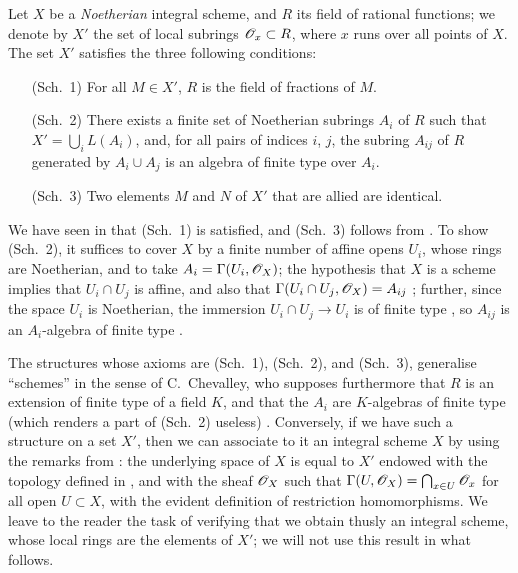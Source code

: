 \begin{env}[8.3.1]
\label{1.8.3.1}
Let $X$ be a {\em Noetherian} integral scheme, and $R$ its
field of rational functions; we denote by $X'$ the set of local subrings
$\mathscr{O}_x\subset R$, where $x$ runs over all points of $X$. The set $X'$ satisfies
the three following conditions:
\begin{enumerate}
  \item[(Sch.~1)] For all $M\in X'$, $R$ is the field of fractions of $M$.
  \item[(Sch.~2)] There exists a finite set of Noetherian subrings $A_i$ of $R$
    such that $X'=\bigcup_i L(A_i)$, and, for all pairs of indices $i$, $j$, the subring
    $A_{ij}$ of $R$ generated by $A_i\cup A_j$ is an algebra of finite type over $A_i$.
  \item[(Sch.~3)] Two elements $M$ and $N$ of $X'$ that are allied are identical.
\end{enumerate}
\end{env}

We have seen in  that (Sch.~1) is satisfied, and (Sch.~3)
follows from . To show (Sch.~2), it suffices to cover $X$ by a
finite number of affine opens $U_i$, whose rings are Noetherian, and to take
$A_i=\Gamma(U_i,\mathscr{O}_X)$; the hypothesis that $X$ is a scheme implies that
$U_i\cap U_j$ is affine, and also that $\Gamma(U_i\cap U_j,\mathscr{O}_X)=A_{ij}$
; further, since the space $U_i$ is Noetherian, the immersion
$U_i\cap U_j\to U_i$ is of finite type , so $A_{ij}$ is an
$A_i$-algebra of finite type .

\begin{env}[8.3.2]
\label{1.8.3.2}
The structures whose axioms are (Sch.~1), (Sch.~2), and
(Sch.~3), generalise ``schemes'' in the sense of C.~Chevalley, who supposes
furthermore that $R$ is an extension of finite type of a field $K$, and that the
$A_i$ are $K$-algebras of finite type (which renders a part of (Sch.~2) useless)
\cite{I-1}. Conversely, if we have such a structure on a set $X'$, then we can
associate to it an integral scheme $X$ by using the remarks from :
the underlying space of $X$ is equal to $X'$ endowed with the topology defined
in , and with the sheaf $\mathscr{O}_X$ such that
$\Gamma(U,\mathscr{O}_X)=\bigcap_{x\in U}\mathscr{O}_x$ for all open $U\subset X$, with the
evident definition of restriction homomorphisms. We leave to the reader the
task of verifying that we obtain thusly an integral scheme, whose local rings
are the elements of $X'$; we will not use this result in what follows.
\end{env}

